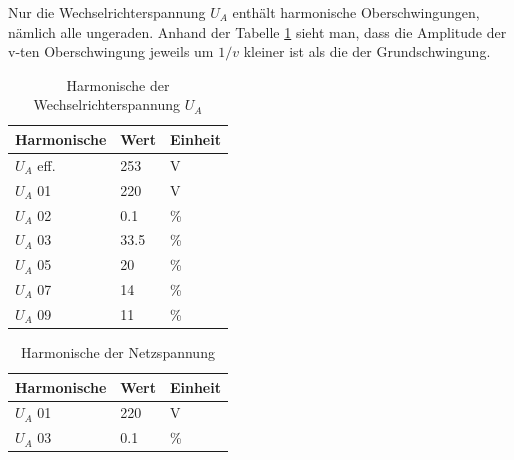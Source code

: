 Nur die Wechselrichterspannung $U_A$ enthält harmonische Oberschwingungen, nämlich alle ungeraden. Anhand der Tabelle \ref{tab:harm_wr} sieht man, dass die Amplitude der v-ten Oberschwingung jeweils um $1/v$ kleiner ist als die der Grundschwingung.

\begin{table}[h]
  \centering
  \begin{tabular}{ l | l | l }
    \hline 
    Harmonische  & Wert & Einheit \\
    \hline \hline
    $U_A$ eff. & 253  &  V\\
    \hline
    $U_A$ 01   & 220  &  V\\  
    \hline 
    $U_A$ 02   & 0.1  &  \%\\  
    \hline
    $U_A$ 03   & 33.5 &  \%\\  
    \hline
    $U_A$ 05   & 20   &  \%\\  
    \hline
    $U_A$ 07   & 14   &  \%\\  
    \hline
    $U_A$ 09   & 11   &  \%\\  
    \hline
  \end{tabular}
  \caption{Harmonische der Wechselrichterspannung $U_A$}
  \label{tab:harm_wr}
\end{table}

\begin{table}[h]
  \centering
  \begin{tabular}{ l | l | l }
    \hline 
    Harmonische  & Wert & Einheit \\
    \hline \hline
    $U_A$ 01   & 220  &  V\\  
    \hline 
    $U_A$ 03   & 0.1  &  \%\\  
    \hline
  \end{tabular}
  \caption{Harmonische der Netzspannung}
  \label{tab:harm_netz}
\end{table}



\clearpage